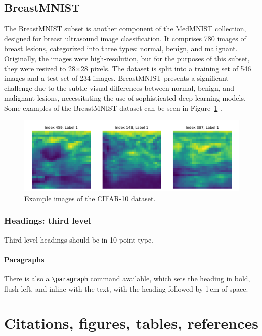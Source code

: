 \documentclass[a4paper]{article}
\begin{document}
\subsection{BreastMNIST}\label{BreastMNIST}
The BreastMNIST subset is another component of the MedMNIST collection, designed for breast ultrasound image classification. It comprises 780 images of breast lesions, categorized into three types: normal, benign, and malignant. Originally, the images were high-resolution, but for the purposes of this subset, they were resized to 28×28 pixels. The dataset is split into a training set of 546 images and a test set of 234 images. BreastMNIST presents a significant challenge due to the subtle visual differences between normal, benign, and malignant lesions, necessitating the use of sophisticated deep learning models. Some examples of the BreastMNIST dataset can be seen in Figure~\ref{fig:breastmnist} \citep{medmnistv1, medmnistv2}.


\begin{figure}[h]
  \centering
  \includegraphics[width=0.5\linewidth]{images/breastmnist_images.png}
  \caption{Example images of the CIFAR-10 dataset.}\label{fig:breastmnist}
\end{figure}



\subsubsection{Headings: third level}


Third-level headings should be in 10-point type.


\paragraph{Paragraphs}


There is also a \verb+\paragraph+ command available, which sets the heading in
bold, flush left, and inline with the text, with the heading followed by 1\,em
of space.


\section{Citations, figures, tables, references}
\label{others}
\end{document}
